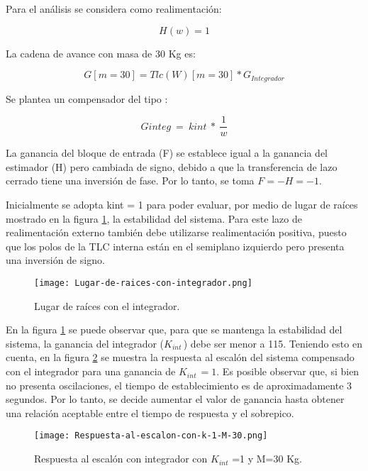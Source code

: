 \noindent Para el an\'{a}lisis se considera como realimentaci\'{o}n: 

\[H(w)=1\] 

\noindent La cadena de avance con masa de 30 Kg es:

\[G[m=30]=Tlc(W)[m=30]*G_{Integrador}\] 

\noindent Se  plantea un compensador del tipo :

\[Ginteg\ =\ kint\ *\ \frac{1}{w}\] 

\noindent La ganancia del bloque de entrada (F) se establece igual a la ganancia del estimador (H) pero cambiada de signo, debido a que la transferencia de lazo cerrado tiene una inversi\'{o}n de fase. Por lo tanto, se toma $F=-H=-1$.

\noindent Inicialmente se adopta kint = 1 para poder evaluar, por medio de lugar de ra\'{i}ces mostrado en la figura \ref{fig:lugar-de-raices-con-integrador}, la estabilidad del sistema. Para este lazo de realimentaci\'{o}n externo tambi\'{e}n debe utilizarse realimentaci\'{o}n positiva, puesto que los polos de la TLC interna est\'{a}n en el semiplano izquierdo pero presenta una inversi\'{o}n de signo.


\begin{figure}[H]
	\centering
	\texttt{[image: Lugar-de-raices-con-integrador.png]}
	\caption{Lugar de raíces con el integrador.}
	\label{fig:lugar-de-raices-con-integrador}
\end{figure}


\noindent En la figura \ref{fig:lugar-de-raices-con-integrador} se puede observar que, para que se mantenga la estabilidad del sistema, la ganancia del integrador ($K_{int\ }$) debe ser menor a 115. Teniendo esto en cuenta, en la figura \ref{fig:respuesta-al-escalon-con-k-1-M-30} se muestra la respuesta al escal\'{o}n del sistema compensado con el integrador para una ganancia de $K_{int\ }=1$.  Es posible observar que, si bien no presenta oscilaciones, el tiempo de establecimiento es de aproximadamente 3 segundos. Por lo tanto, se decide aumentar el valor de ganancia hasta obtener una relaci\'{o}n aceptable entre el tiempo de respuesta y el sobrepico.


\begin{figure}[H]
	\centering
	\texttt{[image: Respuesta-al-escalon-con-k-1-M-30.png]}
	\caption{Respuesta al escalón con integrador con $K_{int}$ =1 y M=30 Kg.}
	\label{fig:respuesta-al-escalon-con-k-1-M-30}
\end{figure}


